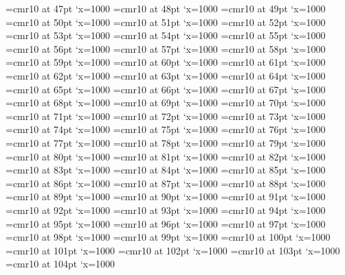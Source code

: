 \font\FABQ=cmr10 at 47pt \efcode\FABQ`x=1000
\font\FABR=cmr10 at 48pt \efcode\FABR`x=1000
\font\FABS=cmr10 at 49pt \efcode\FABS`x=1000
\font\FABT=cmr10 at 50pt \efcode\FABT`x=1000
\font\FABU=cmr10 at 51pt \efcode\FABU`x=1000
\font\FABV=cmr10 at 52pt \efcode\FABV`x=1000
\font\FABW=cmr10 at 53pt \efcode\FABW`x=1000
\font\FABX=cmr10 at 54pt \efcode\FABX`x=1000
\font\FABY=cmr10 at 55pt \efcode\FABY`x=1000
\font\FABZ=cmr10 at 56pt \efcode\FABZ`x=1000
\font\FACA=cmr10 at 57pt \efcode\FACA`x=1000
\font\FACB=cmr10 at 58pt \efcode\FACB`x=1000
\font\FACC=cmr10 at 59pt \efcode\FACC`x=1000
\font\FACD=cmr10 at 60pt \efcode\FACD`x=1000
\font\FACE=cmr10 at 61pt \efcode\FACE`x=1000
\font\FACF=cmr10 at 62pt \efcode\FACF`x=1000
\font\FACG=cmr10 at 63pt \efcode\FACG`x=1000
\font\FACH=cmr10 at 64pt \efcode\FACH`x=1000
\font\FACI=cmr10 at 65pt \efcode\FACI`x=1000
\font\FACJ=cmr10 at 66pt \efcode\FACJ`x=1000
\font\FACK=cmr10 at 67pt \efcode\FACK`x=1000
\font\FACL=cmr10 at 68pt \efcode\FACL`x=1000
\font\FACM=cmr10 at 69pt \efcode\FACM`x=1000
\font\FACN=cmr10 at 70pt \efcode\FACN`x=1000
\font\FACO=cmr10 at 71pt \efcode\FACO`x=1000
\font\FACP=cmr10 at 72pt \efcode\FACP`x=1000
\font\FACQ=cmr10 at 73pt \efcode\FACQ`x=1000
\font\FACR=cmr10 at 74pt \efcode\FACR`x=1000
\font\FACS=cmr10 at 75pt \efcode\FACS`x=1000
\font\FACT=cmr10 at 76pt \efcode\FACT`x=1000
\font\FACU=cmr10 at 77pt \efcode\FACU`x=1000
\font\FACV=cmr10 at 78pt \efcode\FACV`x=1000
\font\FACW=cmr10 at 79pt \efcode\FACW`x=1000
\font\FACX=cmr10 at 80pt \efcode\FACX`x=1000
\font\FACY=cmr10 at 81pt \efcode\FACY`x=1000
\font\FACZ=cmr10 at 82pt \efcode\FACZ`x=1000
\font\FADA=cmr10 at 83pt \efcode\FADA`x=1000
\font\FADB=cmr10 at 84pt \efcode\FADB`x=1000
\font\FADC=cmr10 at 85pt \efcode\FADC`x=1000
\font\FADD=cmr10 at 86pt \efcode\FADD`x=1000
\font\FADE=cmr10 at 87pt \efcode\FADE`x=1000
\font\FADF=cmr10 at 88pt \efcode\FADF`x=1000
\font\FADG=cmr10 at 89pt \efcode\FADG`x=1000
\font\FADH=cmr10 at 90pt \efcode\FADH`x=1000
\font\FADI=cmr10 at 91pt \efcode\FADI`x=1000
\font\FADJ=cmr10 at 92pt \efcode\FADJ`x=1000
\font\FADK=cmr10 at 93pt \efcode\FADK`x=1000
\font\FADL=cmr10 at 94pt \efcode\FADL`x=1000
\font\FADM=cmr10 at 95pt \efcode\FADM`x=1000
\font\FADN=cmr10 at 96pt \efcode\FADN`x=1000
\font\FADO=cmr10 at 97pt \efcode\FADO`x=1000
\font\FADP=cmr10 at 98pt \efcode\FADP`x=1000
\font\FADQ=cmr10 at 99pt \efcode\FADQ`x=1000
\font\FADR=cmr10 at 100pt \efcode\FADR`x=1000
\font\FADS=cmr10 at 101pt \efcode\FADS`x=1000
\font\FADT=cmr10 at 102pt \efcode\FADT`x=1000
\font\FADU=cmr10 at 103pt \efcode\FADU`x=1000
\font\FADV=cmr10 at 104pt \efcode\FADV`x=1000
